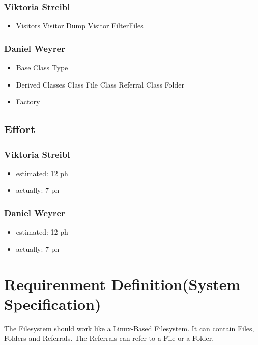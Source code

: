 \subsubsection{Viktoria Streibl}
\begin{itemize}
	\item Visitors
	\subitem Visitor Dump
	\subitem Visitor FilterFiles			
\end{itemize}

\subsubsection{Daniel Weyrer}
\begin{itemize}
	\item Base Class Type
	\item Derived Classes
		\subitem Class File
		\subitem Class Referral
		\subitem Class Folder
	\item Factory
\end{itemize}

\subsection{Effort}

\subsubsection {Viktoria Streibl}
\begin{itemize}
	\item estimated: 12 ph 
	\item actually: 7 ph
\end{itemize}

\subsubsection {Daniel Weyrer}
\begin{itemize}
	\item estimated: 12 ph 
	\item actually: 7 ph
\end{itemize}

\section{Requirenment Definition(System Specification)}
The Filesystem should work like a Linux-Based Filesystem. It can contain Files, Folders and Referrals. The Referrals can refer to a File or a Folder.

